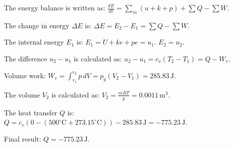 The energy balance is written as:  
\( \frac{dE}{dt} = \sum_{in}(u + k + p) + \sum Q - \sum W \).  

The change in energy \( \Delta E \) is:  
\( \Delta E = E_2 - E_1 = \sum Q - \sum W \).  

The internal energy \( E_1 \) is:  
\( E_1 = U + ke + pe = u_1 \).  
\( E_2 = u_2 \).  

The difference \( u_2 - u_1 \) is calculated as:  
\( u_2 - u_1 = c_v(T_2 - T_1) = Q - W_v \).  

Volume work:  
\( W_v = \int_{v_1}^{v_2} p \, dV = p_g(V_2 - V_1) = 285.83 \, \text{J} \).  

The volume \( V_2 \) is calculated as:  
\( V_2 = \frac{mRT}{p} = 0.0011 \, \text{m}^3 \).  

The heat transfer \( Q \) is:  
\( Q = c_v(0 - (500^\circ \text{C} + 273.15^\circ \text{C})) - 285.83 \, \text{J} = -775.23 \, \text{J} \).  

Final result:  
\( Q = -775.23 \, \text{J} \).